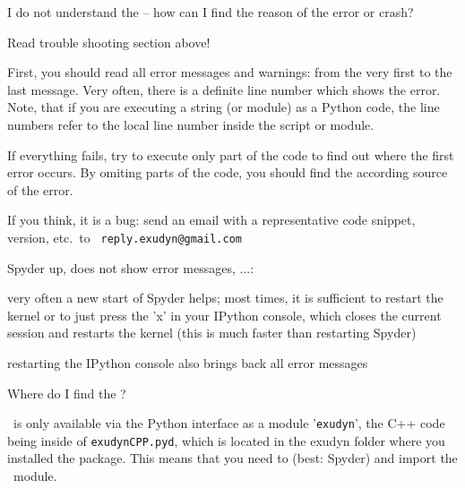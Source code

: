 \ei
\item I do not understand the  -- how can I find the reason of the error or crash?
\bi
\item[$\ra$] Read trouble shooting section above!	
\item[$\ra$] First, you should read all error messages and warnings: from the very first to the last message. Very often, there is a definite line number which shows the error. Note, that if you are executing a string (or module) as a Python code, the line numbers refer to the local line number inside the script or module.
\item[$\ra$] If everything fails, try to execute only part of the code to find out where the first error occurs. By omiting parts of the code, you should find the according source of the error.
\item[$\ra$] If you think, it is a bug: send an email with a representative code snippet, version, etc.\ to \texttt{ reply.exudyn@gmail.com}
\ei
\item Spyder  up, does not show error messages, ...:
\bi
\item[$\ra$] very often a new start of Spyder helps; most times, it is sufficient to restart the kernel or to just press the 'x' in your IPython console, which closes the current session and restarts the kernel (this is much faster than restarting Spyder)
\item[$\ra$] restarting the IPython console also brings back all error messages
\ei
\item Where do I find the ?
\bi
\item[$\ra$] \codeName\ is only available via the Python interface as a module '\texttt{exudyn}', the C++ code being inside of \texttt{exudynCPP.pyd}, which is located in the exudyn folder where you installed the package. This means that you need to  (best: Spyder) and import the \codeName\ module.
\ei
